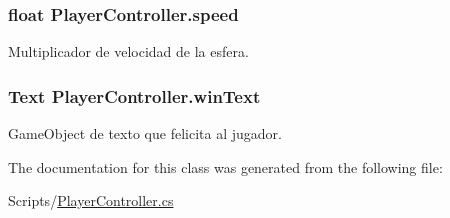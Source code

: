 \hypertarget{class_player_controller_a0928605583f0563cd84fe43119d336ec}{}
\subsubsection[{speed}]{\setlength{\rightskip}{0pt plus 5cm}float Player\+Controller.\+speed}\label{class_player_controller_a0928605583f0563cd84fe43119d336ec}


Multiplicador de velocidad de la esfera. 

\hypertarget{class_player_controller_a366f431ae274e7b19365f7b15b1709b8}{}
\subsubsection[{win\+Text}]{\setlength{\rightskip}{0pt plus 5cm}Text Player\+Controller.\+win\+Text}\label{class_player_controller_a366f431ae274e7b19365f7b15b1709b8}


Game\+Object de texto que felicita al jugador. 



The documentation for this class was generated from the following file\+:\begin{DoxyCompactItemize}
\item 
Scripts/\hyperlink{_player_controller_8cs}{Player\+Controller.\+cs}\end{DoxyCompactItemize}
